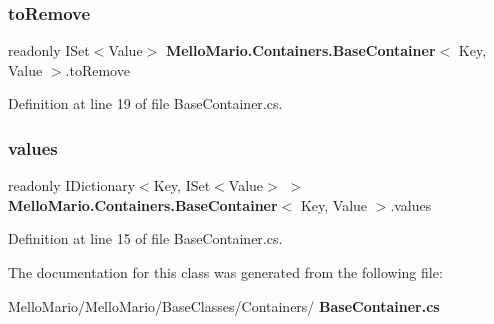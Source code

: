 \subsubsection{to\+Remove}
{\footnotesize\ttfamily readonly I\+Set$<$Value$>$ \textbf{ Mello\+Mario.\+Containers.\+Base\+Container}$<$ Key, Value $>$.to\+Remove\hspace{0.3cm}{\ttfamily [private]}}



Definition at line 19 of file Base\+Container.\+cs.

\mbox{\label{classMelloMario_1_1Containers_1_1BaseContainer_a57db9a9f87112a0fff37dbe867d4e7c4}} 
\subsubsection{values}
{\footnotesize\ttfamily readonly I\+Dictionary$<$Key, I\+Set$<$Value$>$ $>$ \textbf{ Mello\+Mario.\+Containers.\+Base\+Container}$<$ Key, Value $>$.values\hspace{0.3cm}{\ttfamily [private]}}



Definition at line 15 of file Base\+Container.\+cs.



The documentation for this class was generated from the following file\+:\begin{DoxyCompactItemize}
\item 
Mello\+Mario/\+Mello\+Mario/\+Base\+Classes/\+Containers/\textbf{ Base\+Container.\+cs}\end{DoxyCompactItemize}
